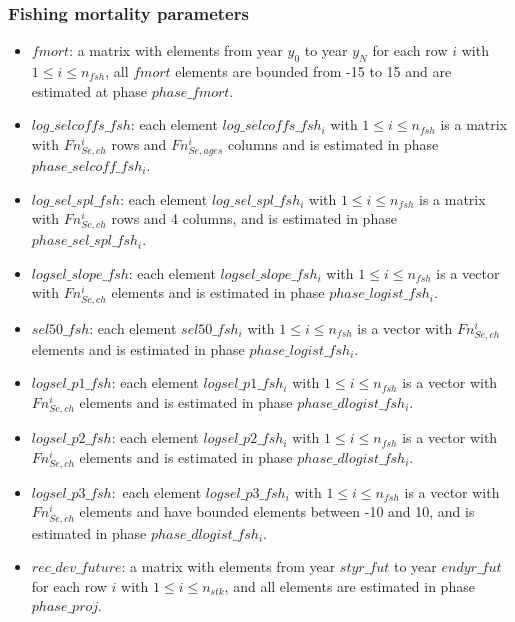 \documentclass{article}
\begin{document}
\subsubsection{Fishing mortality parameters}

\begin{itemize}
   
    \item $fmort$: a matrix with elements from year $y_0$ to year $y_N$ for each row $i$ with $1\leq i \leq n_{fsh}$, all $fmort$ elements are bounded from -15 to 15 and are estimated at phase $phase\_fmort$.
    
    \item $log\_selcoffs\_fsh$: each element $log\_selcoffs\_fsh_i$ with $1\leq i \leq n_{fsh}$ is a matrix with $Fn_{Se,ch}^i$%
    rows and $Fn_{Se,ages}^i$ %
    columns and is estimated in phase $phase\_selcoff\_fsh_i$.
 
    \item $log\_sel\_spl\_fsh$: each element $log\_sel\_spl\_fsh_i$ with $1\leq i \leq n_{fsh}$ is a matrix with $Fn_{Se,ch}^i$ %
    rows and 4 columns, and is estimated in phase $phase\_sel\_spl\_fsh_i$.

    \item $logsel\_slope\_fsh$: each element $logsel\_slope\_fsh_i$ with $1\leq i \leq n_{fsh}$ is a vector with $Fn_{Se,ch}^i$ %
    elements and is estimated in phase $phase\_logist\_fsh_i$.
   
    \item $sel50\_fsh$: each element $sel50\_fsh_i$ with $1\leq i\leq n_{fsh}$ is a vector with $Fn_{Se,ch}^i$ %
    elements and is estimated in phase $phase\_logist\_fsh_i$.
   
    \item $logsel\_p1\_fsh$: each element $logsel\_p1\_fsh_i$ with $1\leq i \leq n_{fsh}$ is a vector with $Fn_{Se,ch}^i$ %
    elements and is estimated in phase $phase\_dlogist\_fsh_i$.   

    \item $logsel\_p2\_fsh$: each element $logsel\_p2\_fsh_i$ with $1\leq i \leq n_{fsh}$ is a vector with $Fn_{Se,ch}^i$ %
    elements and is estimated in phase $phase\_dlogist\_fsh_i$.
    
    \item $logsel\_p3\_fsh:$ each element $logsel\_p3\_fsh_i$ with $1\leq i \leq n_{fsh}$ is a vector with $Fn_{Se,ch}^i$ %
    elements and have bounded elements between -10 and 10, and is estimated in phase $phase\_dlogist\_fsh_i$.
    
    \item $rec\_dev\_future$: a matrix with elements from year $styr\_fut$ to year $endyr\_fut$ for each row $i$ with $1\leq i \leq n_{stk}$, and all elements are estimated in phase $phase\_proj$.
\end{itemize}
\end{document}
